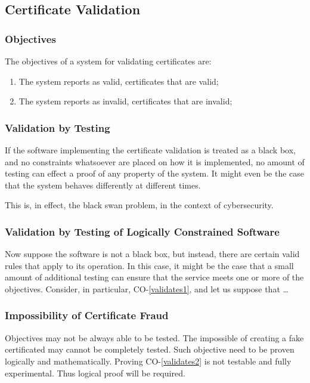 \documentclass[journal]{IEEEtran}
\begin{document}
\subsection{Certificate Validation}

\subsubsection{Objectives}

The objectives of a system for validating certificates are:
\begin{enumerate}[CO-1]
  \item\label{validates1} The system reports as valid, certificates that are valid;
  \item\label{validates2} The system reports as invalid, certificates that are invalid;
\end{enumerate}

\subsubsection{Validation by Testing}

If the software implementing the certificate validation is treated
as a black box, and no constraints whatsoever are placed on how it is
implemented, no amount of testing can effect a proof of any
property of the system. It might even be the case that the system
behaves differently at different times.

This is, in effect, the black swan problem, in the context of cybersecurity.

\subsubsection{Validation by Testing of Logically Constrained Software}

Now suppose the software is not a black box, but instead, there
are certain valid rules that apply to its operation. In this case,
it might be the case that a small amount of additional testing
can ensure that the service meets one or more of the objectives.
Consider, in particular, CO-\ref{validates1}, and let us suppose
that \dots

\subsubsection{Impossibility of Certificate Fraud}
Objectives may not be always able to be tested. The impossible of
creating a fake certificated may cannot be completely tested.
Such objective need to be proven logically and mathematically.
Proving CO-\ref{validates2} is not testable and fully experimental.
Thus logical proof will be required.
\end{document}
